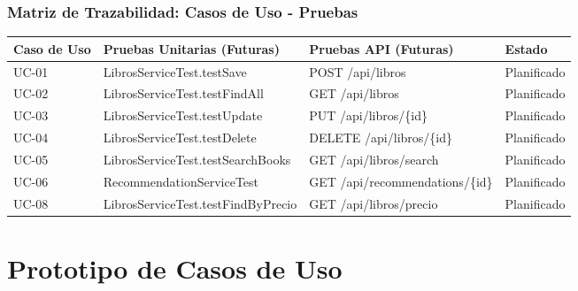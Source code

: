 \documentclass[aspectratio=169]{beamer}
\begin{document}
\begin{frame}
\frametitle{Matriz de Trazabilidad: Casos de Uso - Pruebas}

\begin{table}
\centering
\tiny
\begin{tabular}{p{1.5cm}p{5.5cm}p{5.5cm}p{1cm}}
\toprule
\textbf{Caso de Uso} & \textbf{Pruebas Unitarias (Futuras)} & \textbf{Pruebas API (Futuras)} & \textbf{Estado} \\
\midrule
UC-01 & LibrosServiceTest.testSave & POST /api/libros & Planificado \\
UC-02 & LibrosServiceTest.testFindAll & GET /api/libros & Planificado \\
UC-03 & LibrosServiceTest.testUpdate & PUT /api/libros/\{id\} & Planificado \\
UC-04 & LibrosServiceTest.testDelete & DELETE /api/libros/\{id\} & Planificado \\
UC-05 & LibrosServiceTest.testSearchBooks & GET /api/libros/search & Planificado \\
UC-06 & RecommendationServiceTest & GET /api/recommendations/\{id\} & Planificado \\
UC-08 & LibrosServiceTest.testFindByPrecio & GET /api/libros/precio & Planificado \\
\bottomrule
\end{tabular}
\end{table}

\end{frame}

\section{Prototipo de Casos de Uso}
\end{document}
